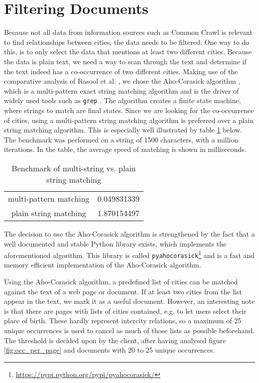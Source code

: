 \section{Filtering Documents} \label{sec:filtering_docs}
Because not all data from information sources such as Common Crawl is relevant to find relationships between cities, the data needs to be filtered. One way to do this, is to only select the data that mentions at least two different cities. Because the data is plain text, we need a way to scan through the text and determine if the text indeed has a co-occurrence of two different cities.
Making use of the comparative analysis of Rasool et al. \cite{rasool2012string}, we chose the Aho-Corasick algorithm \cite{Aho-Corasick}, which is a multi-pattern exact string matching algorithm and is the driver of widely used tools such as \texttt{grep} \cite{kernighan1984unix}. The algorithm creates a finite state machine, where strings to match are final states. Since we are looking for the co-occurrence of cities, using a multi-pattern string matching algorithm is preferred over a plain string matching algorithm. This is especially well illustrated by table \ref{tab:bm-matching} below. The benchmark was performed on a string of 1500 characters, with a million iterations. In the table, the average speed of matching is shown in milliseconds.

\begin{table}[H]
\centering
\begin{tabular}{ |c|c| } 
    \hline
    multi-pattern matching & 0.049831339 \\
    plain string matching &  1.870154497 \\
    \hline
\end{tabular}
\caption{Benchmark of multi-string vs. plain string matching}
\label{tab:bm-matching}
\end{table}

The decision to use the Aho-Corasick algorithm is strengthened by the fact that a well documented and stable Python library exists, which implements the aforementioned algorithm. This library is called \texttt{pyahocorasick}\footnote{\url{https://pypi.python.org/pypi/pyahocorasick/}} and is a fast and memory efficient implementation of the Aho-Corasick algorithm.

Using the Aho-Corasick algorithm, a predefined list of cities can be matched against the text of a web page or document. If at least two cities from the list appear in the text, we mark it as a useful document. However, an interesting note is that there are pages with lists of cities contained, e.g. to let users select their place of birth. These hardly represent intercity relations, so a maximum of 25 unique occurrences is used to cancel as much of those lists as possible beforehand. The threshold is decided upon by the client, after having analysed figure \ref{fig:occ_per_page} and documents with 20 to 25 unique occurrences.

